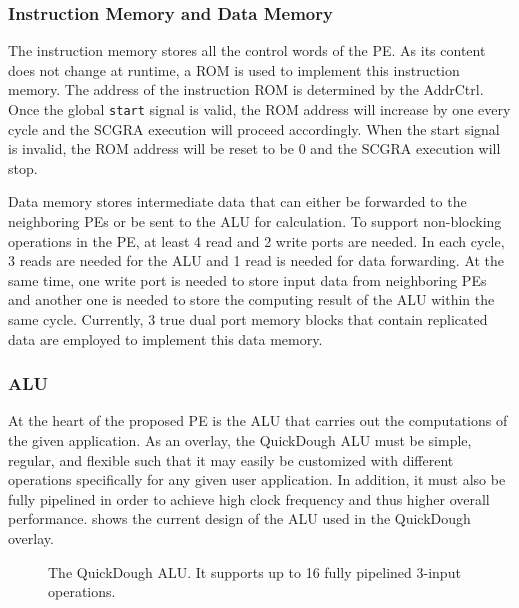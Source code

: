 \subsubsection{Instruction Memory and Data Memory}
The instruction memory stores all the control words of the PE.  As its content does not change at runtime, a ROM is used to implement this instruction memory. The address of the instruction ROM is determined by the AddrCtrl. Once the global
\texttt{start}
signal is valid, the ROM address will increase by one every cycle and the SCGRA execution will proceed accordingly. When the start signal is invalid, the ROM address will be reset to be 0 and the SCGRA execution will stop.

Data memory stores intermediate data that can either be forwarded to the neighboring PEs or be sent to the ALU for calculation.
To support non-blocking operations in the PE, at least 4 read and 2 write ports are needed.  In each cycle, 3 reads are needed for the ALU and 1 read is needed for data forwarding.  At the same time, one write port is needed to store input data from neighboring PEs and another one is needed to store the computing result of the ALU within the same cycle.
%
Currently, 3 true dual port memory blocks that contain replicated data are employed to implement this data memory.

\subsubsection{ALU}
At the heart of the proposed PE is the ALU that carries out the computations of the given application.  As an overlay, the QuickDough ALU must be simple, regular, and flexible such that it may easily be customized with different operations specifically for any given user application.  In addition, it must also be fully pipelined in order to achieve high clock frequency and thus higher overall performance.   shows the current design of the ALU used in the QuickDough overlay.

\begin{figure}
\caption{The QuickDough ALU.   It supports up to 16 fully pipelined 3-input operations.}
\label{fig:ALU}
\end{figure} 

